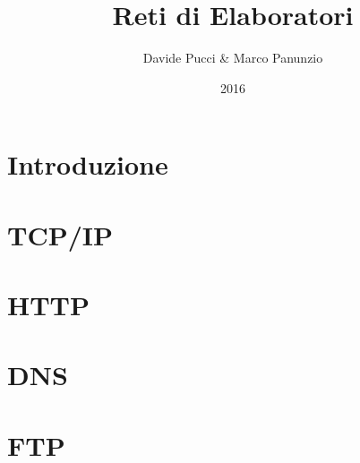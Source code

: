 

\title{Reti di Elaboratori}
\author{Davide Pucci \& Marco Panunzio}
\date{2016}



\maketitle

\tableofcontents

\chapter{Introduzione}


\chapter{TCP/IP}


\chapter{HTTP}


\chapter{DNS}


\chapter{FTP}


